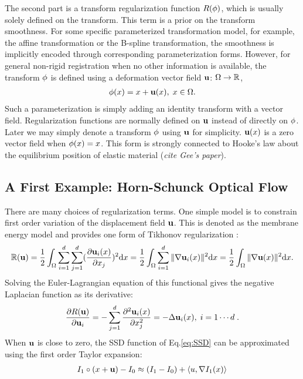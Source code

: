\documentclass[letterpaper,12pt]{article}
\begin{document}
The second part is a transform regularization function $R(\phi)$,
which is usually solely defined on the transform. This term is a prior
on the transform smoothness. For some specific parameterized transformation model, for example, the affine transformation or the B-spline transformation, the smoothness is implicitly encoded through corresponding parameterization forms. 
However, for general non-rigid registration when no other information is available, the transform $\phi$ is defined using a deformation vector field $\mathbf{u}$: $\Omega \to \mathbb{R}$,
\begin{align}
\phi(x) = x + \mathbf{u}(x), \; x \in \Omega.
\end{align}
Such a parameterization is simply adding an identity transform with a vector field. 
Regularization functions are normally defined on $\mathbf{u}$ instead of directly on $\phi$.
Later we may simply denote a transform $\phi$ using $\mathbf{u}$ for simplicity. 
$\mathbf{u}(x)$ is a zero vector field when $\phi(x)=x$. 
This form is strongly connected to Hooke's law about the equilibrium position of elastic material (\textit{cite Gee's paper}). 



\subsection{A First Example: Horn-Schunck Optical Flow}
\label{sec:opticalflow}
There are many choices of regularization terms. One simple model is to
constrain first order variation of the displacement field $\mathbf{u}$. This
is denoted as the membrane energy model \cite{Ashburner2007} and
provides one form of Tikhonov regularization \cite{Horn1981}:
\begin{align}
\label{eq:membrane}
\mathbb{R}(\mathbf{u}) = \frac{1}{2} \int_\Omega \sum_{i=1}^d\sum_{j=1}^d (\frac{\partial \mathbf{u}_i(x)}{\partial x_j})^2 \text{d} x
= \frac{1}{2} \int_\Omega \sum_{i=1}^d \| \nabla \mathbf{u}_i(x) \|^2 \text{d} x = \frac{1}{2} \int_\Omega \| \nabla\mathbf{u}(x)\|^2 \text{d} x.
\end{align}
Solving the Euler-Lagrangian equation of this functional gives the negative Laplacian function as its derivative:
\begin{align}
\label{eq:membraneEL}
\frac{\partial R(\mathbf{u})}{\partial \mathbf{u}_i} = -  \sum_{j=1}^d \frac{\partial^2 \mathbf{u}_i(x)}{\partial x_j^2} 
= -  \Delta \mathbf{u}_i(x) 
, \; i=1 \cdots d \;.
\end{align}
When $\mathbf{u}$ is close to zero, the SSD function of Eq.\ref{eq:SSD} can be approximated using the first order Taylor expansion:
\begin{align}
I_1 \circ (x + \mathbf{u} ) - I_0 \approx (I_1 - I_0 ) + \langle u, \nabla I_1(x) \rangle
\label{eq:approxopticalflow}
\end{align}
\end{document}

